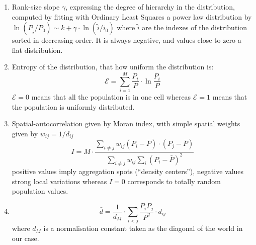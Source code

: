 \documentclass[10pt,letterpaper]{article}
\begin{document}
\begin{enumerate}
\item Rank-size slope $\gamma$, expressing the degree of hierarchy in the distribution, computed by fitting with Ordinary Least Squares a power law distribution by $\ln \left( P_{\tilde{i}}/P_0\right) \sim k + \gamma\cdot \ln \left(\tilde{i}/i_0\right)$ where $\tilde{i}$ are the indexes of the distribution sorted in decreasing order. It is always negative, and values close to zero  a flat distribution.
\item Entropy of the distribution, that  how uniform the distribution is:
\begin{equation}
\mathcal{E} = \sum_{i=1}^{M}\frac{P_i}{P}\cdot \ln{\frac{P_i}{P}}
\end{equation}
$\mathcal{E}=0$ means that all the population is in one cell whereas $\mathcal{E}=1$ means that the population is uniformly distributed.
\item Spatial-autocorrelation given by Moran index, with simple spatial weights given by $w_{ij} = 1/d_{ij}$
\begin{equation}
I = M \cdot \frac{\sum_{i\neq j} w_{ij} \left(P_i - \bar{P}\right)\cdot\left(P_j - \bar{P}\right)}{\sum_{i\neq j} w_{ij} \sum_{i}{\left( P_i - \bar{P}\right)}^2}
\end{equation}
 positive values  imply aggregation spots (``density centers''), negative values strong local variations whereas $I=0$ corresponds to totally random population values.
\item {}
\begin{equation}
\bar{d} = \frac{1}{d_M}\cdot \sum_{i<j} \frac{P_i P_j}{P^2} \cdot d_{ij}
\end{equation}
where $d_M$ is a normalisation constant taken as the  diagonal of the world in our case.
\end{enumerate}


\end{document}
